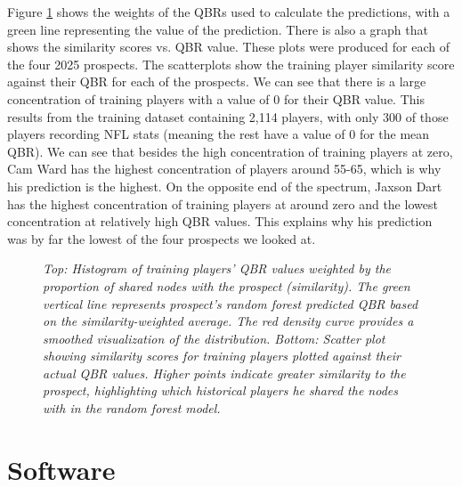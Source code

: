 \documentclass{article}
\begin{document}
Figure \ref{fig:prospect-plots} shows the weights of the QBRs used to calculate the predictions, with a green line representing the value of the prediction. There is also a graph that shows the similarity scores vs. QBR value. These plots were produced for each of the four 2025 prospects. The scatterplots show the training player similarity score against their QBR for each of the prospects. We can see that there is a large concentration of training players with a value of 0 for their QBR value. This results from the training dataset containing 2,114 players, with only 300 of those players recording NFL stats (meaning the rest have a value of 0 for the mean QBR). We can see that besides the high concentration of training players at zero, Cam Ward has the highest concentration of players around 55-65, which is why his prediction is the highest. On the opposite end of the spectrum, Jaxson Dart has the highest concentration of training players at around zero and the lowest concentration at relatively high QBR values. This explains why his prediction was by far the lowest of the four prospects we looked at.

\begin{figure}[H]
    \centering
    \caption{\textit{Top: Histogram of training players’ QBR values weighted by the proportion of shared nodes with the prospect (similarity). The green vertical line represents prospect’s random forest predicted QBR based on the similarity-weighted average. The red density curve provides a smoothed visualization of the distribution.
    Bottom: Scatter plot showing similarity scores for training players plotted against their actual QBR values. Higher points indicate greater similarity to the prospect, highlighting which historical players he shared the nodes with in the random forest model.}}
    \label{fig:prospect-plots}
\end{figure}

\section{Software}
\label{sec:software}
\end{document}
